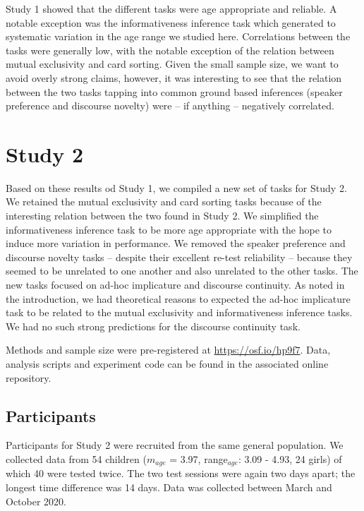 \documentclass[
  english,
  man,floatsintext]{apa6}
\begin{document}
Study 1 showed that the different tasks were age appropriate and reliable. A notable exception was the informativeness inference task which generated to systematic variation in the age range we studied here. Correlations between the tasks were generally low, with the notable exception of the relation between mutual exclusivity and card sorting. Given the small sample size, we want to avoid overly strong claims, however, it was interesting to see that the relation between the two tasks tapping into common ground based inferences (speaker preference and discourse novelty) were -- if anything -- negatively correlated.

\hypertarget{study-2}{%
\section{Study 2}\label{study-2}}

Based on these results od Study 1, we compiled a new set of tasks for Study 2. We retained the mutual exclusivity and card sorting tasks because of the interesting relation between the two found in Study 2. We simplified the informativeness inference task to be more age appropriate with the hope to induce more variation in performance. We removed the speaker preference and discourse novelty tasks -- despite their excellent re-test reliability -- because they seemed to be unrelated to one another and also unrelated to the other tasks. The new tasks focused on ad-hoc implicature and discourse continuity. As noted in the introduction, we had theoretical reasons to expected the ad-hoc implicature task to be related to the mutual exclusivity and informativeness inference tasks. We had no such strong predictions for the discourse continuity task.

Methods and sample size were pre-registered at \url{https://osf.io/hp9f7}. Data, analysis scripts and experiment code can be found in the associated online repository.

\hypertarget{participants-1}{%
\subsection{Participants}\label{participants-1}}

Participants for Study 2 were recruited from the same general population. We collected data from 54 children (\(m_{age}\) = 3.97, range\(_{age}\): 3.09 - 4.93, 24 girls) of which 40 were tested twice. The two test sessions were again two days apart; the longest time difference was 14 days. Data was collected between March and October 2020.
\end{document}
